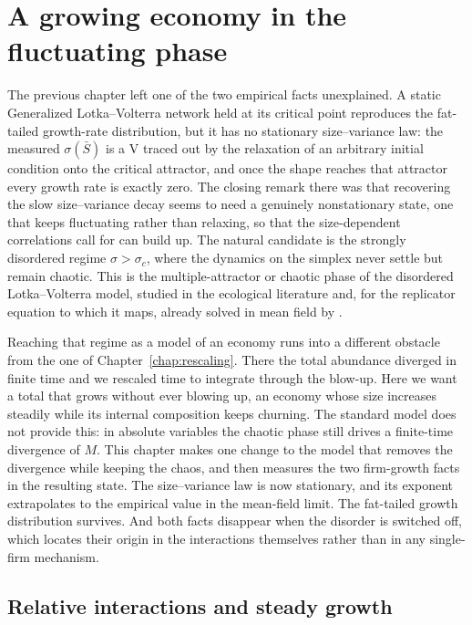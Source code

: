 \chapter{A growing economy in the fluctuating phase}
\label{chap:growing}

The previous chapter left one of the two empirical facts unexplained. A static
Generalized Lotka--Volterra network held at its critical point reproduces the
fat-tailed growth-rate distribution, but it has no stationary size--variance law: the
measured $\sigma(\bar S)$ is a V traced out by the relaxation of an arbitrary initial
condition onto the critical attractor, and once the shape reaches that attractor every
growth rate is exactly zero. The closing remark there was that recovering the slow
size--variance decay seems to need a genuinely nonstationary state, one that keeps
fluctuating rather than relaxing, so that the size-dependent correlations
\citet{moran2024} call for can build up. The natural candidate is the strongly
disordered regime $\sigma > \sigma_c$, where the dynamics on the simplex never settle
but remain chaotic. This is the multiple-attractor or chaotic phase of the disordered
Lotka--Volterra model, studied in the ecological literature
\citep{bunin2017,galla2018,roy2020} and, for the replicator equation to which it maps,
already solved in mean field by \citet{diederich1989}.

Reaching that regime as a model of an economy runs into a different obstacle from the
one of Chapter~\ref{chap:rescaling}. There the total abundance diverged in finite time
and we rescaled time to integrate through the blow-up. Here we want a total that grows
without ever blowing up, an economy whose size increases steadily while its internal
composition keeps churning. The standard model does not provide this: in absolute
variables the chaotic phase still drives a finite-time divergence of $M$. This chapter
makes one change to the model that removes the divergence while keeping the chaos, and
then measures the two firm-growth facts in the resulting state. The size--variance law
is now stationary, and its exponent extrapolates to the empirical value in the
mean-field limit. The fat-tailed growth distribution survives. And both facts disappear
when the disorder is switched off, which locates their origin in the interactions
themselves rather than in any single-firm mechanism.

\section{Relative interactions and steady growth}
\label{sec:relative-model}

